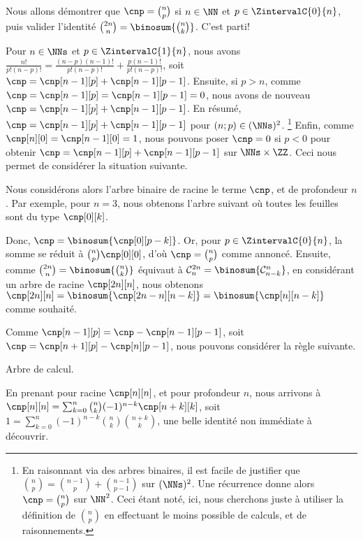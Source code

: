 Nous allons démontrer que $\cnp = \binom{n}{p}$ si $n \in \NN$ et $p \in \ZintervalC{0}{n}$,
puis valider l'identité $\binom{2n}{n} = \binosum{\binom{n}{k}}$.
C'est parti!


Pour $n \in \NNs$ et $p \in \ZintervalC{1}{n}$,
nous avons
$\frac{n!}{p!(n-p)!}
=\frac{(n-p)(n-1)!}{p!(n-p)!} + \frac{p(n-1)!}{p!(n-p)!}$,
soit
$\cnp = \cnp[n-1][p] + \cnp[n-1][p-1]$.
Ensuite,
si $p > n$, comme
$\cnp = \cnp[n-1][p] = \cnp[n-1][p-1] = 0$,
nous avons de nouveau
$\cnp = \cnp[n-1][p] + \cnp[n-1][p-1]$.
En résumé,
$\cnp = \cnp[n-1][p] + \cnp[n-1][p-1]$ pour $(n;p) \in  (\NNs)^2$.%
\footnote{
	En raisonnant via des arbres binaires,
	il est facile de justifier que 
	$\binom{n}{p} = \binom{n-1}{p} + \binom{n-1}{p-1}$ sur $ (\NNs)^2$.
	Une récurrence donne alors 
	$\cnp = \binom{n}{p}$ sur $\NN^2$.
	Ceci étant noté, ici, nous cherchons juste à utiliser la définition de $\binom{n}{p}$ en effectuant le moins possible de calculs, et de raisonnements.
}
Enfin,
comme
$\cnp[n][0] = \cnp[n-1][0] = 1$,
nous pouvons poser
$\cnp = 0$ si $p < 0$
pour obtenir
$\cnp = \cnp[n-1][p] + \cnp[n-1][p-1]$ sur $\NNs \times \ZZ$.
%
Ceci nous permet de considérer la situation suivante.

\explaintree{\cnp}{\cnp[n-1][p-1]}{\cnp[n-1][p]}%
            {\factobinomintertree}{}


Nous considérons alors l'arbre binaire de racine le terme $\cnp$, et de profondeur $n$.
Par exemple, pour $n=3$, nous obtenons l'arbre suivant où toutes les feuilles sont du type $\cnp[0][k]$.


Donc,
$\cnp = \binosum{\cnp[0][p-k]}$.
Or, pour $p \in \ZintervalC{0}{n}$, la somme se réduit à $\binom{n}{p} \cnp[0][0]$, d'où $\cnp = \binom{n}{p}$ comme annoncé.
%
Ensuite,
comme
$\binom{2n}{n} = \binosum{\binom{n}{k}}$
équivaut à
$\mathcal{C}^{2n}_n = \binosum{\mathcal{C}^n_{n-k}}$,
en considérant un arbre de racine $\cnp[2n][n]$, nous obtenons
$\cnp[2n][n] = \binosum{\cnp[2n - n][n-k]} = \binosum{\cnp[n][n-k]}$
comme souhaité.




\begin{remark}
	Comme $\cnp[n-1][p] = \cnp - \cnp[n-1][p-1]$,
	soit $\cnp = \cnp[n+1][p] - \cnp[n][p-1]$,
	nous pouvons considérer la règle suivante.

    \begin{center}
    	\itshape\centering
    
    	\calctree{\cnp}{\cnp[n+1][p]}{-\cnp[n][p-1]}
    	
    	Arbre de calcul.
    \end{center}
    
    En prenant pour racine $\cnp[n][n]$, et pour profondeur $n$,
	nous arrivons à
    $\cnp[n][n] = \sum_{k=0}^n \binom{n}{k} (-1)^{n-k} \cnp[n+k][k]$,
    soit
    $1 = \sum_{k=0}^n (-1)^{n-k} \binom{n}{k} \binom{n+k}{k}$,
    une belle identité non immédiate à découvrir.
\end{remark}
